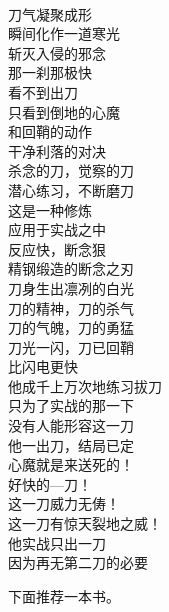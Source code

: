 \begin{poem}[一刀流]
    \begin{multicols}{3}
        \begin{center}~\\
            刀气凝聚成形 \\ 瞬间化作一道寒光 \\ 斩灭入侵的邪念 \\ 那一刹那极快 \\ 看不到出刀 \\ 只看到倒地的心魔 \\ 和回鞘的动作 \\ 干净利落的对决 \\ 杀念的刀，觉察的刀 \\ 潜心练习，不断磨刀 \\ 这是一种修炼 \\ 应用于实战之中 \\ 反应快，断念狠 \\ 精钢缎造的断念之刃 \\ 刀身生出凛冽的白光 \\ 刀的精神，刀的杀气 \\ 刀的气魄，刀的勇猛 \\ 刀光一闪，刀已回鞘 \\ 比闪电更快 \\ 他成千上万次地练习拔刀 \\ 只为了实战的那一下 \\ 没有人能形容这一刀 \\ 他一出刀，结局已定 \\ 心魔就是来送死的！ \\ 好快的—刀！ \\ 这一刀威力无俦！ \\ 这一刀有惊天裂地之威！ \\ 他实战只出一刀 \\ 因为再无第二刀的必要
        \end{center}
    \end{multicols}
\end{poem}

下面推荐一本书。

